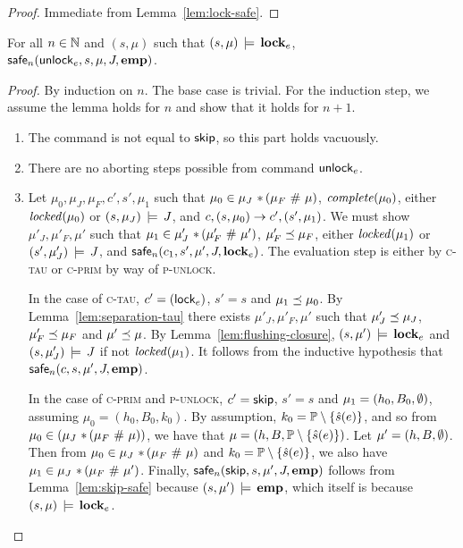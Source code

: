 \documentclass[11pt]{report}
\begin{document}
\begin{proof}
    Immediate from Lemma~\ref{lem:lock-safe}. 
\end{proof}

\begin{lemma}
    \label{lem:unlock-safe}
    For all $n \in \mathbb{N}$ and $(s,\mu)$ such that $(s,\mu) \,\models\, \mathbf{lock}_{e}$, \\ $\mathsf{safe}_{n}(\operatorname{\mathsf{unlock}}_{e},s,\mu,J,\mathbf{emp})$. 
\end{lemma}

\begin{proof}
  By induction on $n$. The base case is trivial. For the induction step, we assume the lemma holds for $n$ and show that it holds for $n+1$.

    \begin{enumerate}
        \item The command is not equal to $\operatorname{\mathsf{skip}}$, so this part holds vacuously. 

        \item There are no aborting steps possible from command $\operatorname{\mathsf{unlock}}_e$. 

        \item Let $\mu_0,\mu_J,\mu_F,c',s',\mu_1$ such that $\mu_0 \in \mu_J \operatorname{\,\ast\,} (\mu_F \operatorname{\,\#\,} \mu)$, $\mathit{complete}(\mu_0)$, either $\mathit{locked}(\mu_0)$ or $(s,\mu_J) \,\models\, J$, and $c,(s,\mu_0) \rightarrow c',(s',\mu_1)$. We must show $\mu'_J,\mu'_F,\mu'$ such that $\mu_1 \in \mu'_J \operatorname{\,\ast\,} (\mu'_F \operatorname{\,\#\,} \mu')$, $\mu'_F \preceq \mu_F$, either $\mathit{locked}(\mu_1)$ or $(s',\mu'_J) \,\models\, J$, and $\mathsf{safe}_{n}(c_1,s',\mu',J,\mathbf{lock}_{e})$. The evaluation step is either by \textsc{c-tau} or \textsc{c-prim} by way of \textsc{p-unlock}. 

        In the case of \textsc{c-tau}, $c' = (\operatorname{\mathsf{lock}}_{e})$, $s' = s$ and $\mu_1 \preceq \mu_0$. By Lemma~\ref{lem:separation-tau} there exists $\mu'_J,\mu'_F,\mu'$ such that $\mu'_J \preceq \mu_J$, $\mu'_F \preceq \mu_F$ and $\mu' \preceq \mu$. By Lemma~\ref{lem:flushing-closure}, $(s,\mu') \,\models\, \mathbf{lock}_{e}$ and $(s,\mu'_J) \,\models\, J$ if not $\mathit{locked}(\mu_1)$. It follows from the inductive hypothesis that $\mathsf{safe}_{n}(c,s,\mu',J,\mathbf{emp})$. 

        In the case of \textsc{c-prim} and \textsc{p-unlock}, $c' = \operatorname{\mathsf{skip}}$, $s' = s$ and $\mu_1 = (h_0,B_0,\operatorname{\emptyset})$, assuming $\mu_0 = (h_0,B_0,k_0)$. By assumption, $k_0 = \mathbb{P} \setminus \left\lbrace \hat{s}(e) \right\rbrace$, and so from $\mu_0  \in (\mu_J \operatorname{\,\ast\,} (\mu_F \operatorname{\,\#\,} \mu))$, we have that $\mu = (h,B,\mathbb{P} \setminus \left\lbrace \hat{s}(e) \right\rbrace)$. Let $\mu' = (h,B,\operatorname{\emptyset})$. Then from $\mu_0 \in \mu_J \operatorname{\,\ast\,} (\mu_F \operatorname{\,\#\,} \mu)$ and $k_0 = \mathbb{P} \setminus \left\lbrace \hat{s}(e) \right\rbrace$, we also have $\mu_1 \in \mu_J \operatorname{\,\ast\,} (\mu_F \operatorname{\,\#\,} \mu')$. Finally, $\mathsf{safe}_{n}(\operatorname{\mathsf{skip}},s,\mu',J,\mathbf{emp})$ follows from Lemma~\ref{lem:skip-safe} because $(s,\mu') \,\models\, \mathbf{emp}$, which itself is because $(s,\mu) \,\models\, \mathbf{lock}_{e}$.  

    \end{enumerate}
\end{proof}
\end{document}
